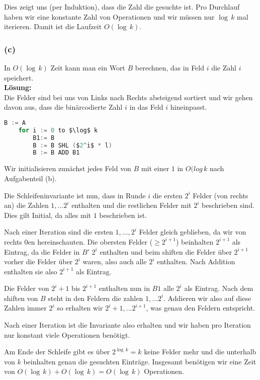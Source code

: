 \documentclass[11pt,a4paper,ngerman]{article}
\begin{document}
Dies zeigt uns (per Induktion), dass die Zahl die gesuchte ist. Pro Durchlauf haben wir eine konstante Zahl von Operationen und
wir müssen nur $\log \, k$ mal iterieren. Damit ist die Laufzeit $O(\log \, k)$.

\subsubsection*{(c)}
In $O(\log \, k)$ Zeit kann man ein Wort $B$ berechnen, das in Feld $i$ die Zahl $i$ speichert.\\

\noindent\textbf{Lösung:}\\

Die Felder sind bei uns von Links nach Rechts absteigend sortiert und wir gehen davon aus,
dass die binärcodierte Zahl $i$ in das Feld $i$ hineinpasst.

\begin{lstlisting}[frame=single, language=C, morekeywords={:=,SHR,SHL,NOT,XOR,AND,OR,MUL}]
	B := A
	for i := 0 to $\log$ k
		B1:= B
		B := B SHL ($2^i$ * l)
		B := B ADD B1
\end{lstlisting}

Wir initialisieren zunächst jedes Feld von $B$ mit einer $1$ in $O(log \, k$ nach Aufgabenteil (b).

Die Schleifeninvariante ist nun, dass in Runde $i$ die ersten $2^i$ Felder (von rechts an) die Zahlen $1, \ldots 2^i$ enthalten und
die restlichen Felder mit $2^i$ beschrieben sind. Dies gilt Initial, da alles mit $1$ beschrieben ist.

Nach einer Iteration sind die ersten $1, \ldots, 2^i$ Felder gleich geblieben, da wir von rechts $0$en hereinschauten. Die obersten Felder ($\geq 2^{i+1}$) beinhalten $2^{i+1}$ als Eintrag, da die Felder in $B'$ $2^i$ enthalten und beim shiften die Felder über $2^{i+1}$ vorher die Felder
über $2^i$ waren, also auch alle $2^i$ enthalten. Nach Addition enthalten sie also $2^{i+1}$ als Eintrag.

Die Felder von $2^i+1$ bis $2^{i+1}$ enthalten nun in $B1$ alle $2^i$ als Eintrag. Nach dem shiften von $B$ steht in den Feldern die zahlen
$1, \ldots 2^i$. Addieren wir also auf diese Zahlen immer $2^i$ so erhalten wir $2^i+1,\ldots 2^{i+1}$, was genau den Feldern entspricht.

Nach einer Iteration ist die Invariante also erhalten und wir haben pro Iteration nur konstant viele Operationen benötigt.

Am Ende der Schleife gibt es über $2^{\log \, k} = k$ keine Felder mehr und die unterhalb von $k$ beinhalten genau die gesuchten Einträge.
Insgesamt benötigen wir eine Zeit von $O(\log \, k) + O(\log \, k) = O(\log \, k)$ Operationen.
\end{document}

